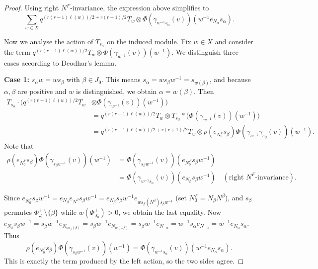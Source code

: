 \documentclass[12pt]{article}
\theoremstyle{remark}
\begin{document}
\begin{proof}
Using right $N^F$-invariance, the expression above simplifies to
$$
\sum_{w \in X} q^{(r(r-1)\ell(w))/2 + r(r+1)/2} T_w \otimes \Phi(\gamma_{w^{-1}s_\alpha}(v))(w^{-1} e_{N_\alpha} s_\alpha).
$$

Now we analyse the action of $T_{s_\alpha}$ on the induced module. Fix $w \in X$ and consider the term $q^{(r(r-1)\ell(w))/2} T_w \otimes \Phi(\gamma_{w^{-1}}(v))(w^{-1})$. We distinguish three cases according to Deodhar's lemma.

\noindent\textbf{Case 1:} $s_\alpha w = w s_\beta$ with $\beta \in J_0$.
This means $s_\alpha = w s_\beta w^{-1} = s_{w(\beta)}$, and because $\alpha,\beta$ are positive and $w$ is distinguished, we obtain $\alpha = w(\beta)$. Then
\begin{align*}
T_{s_\alpha} \cdot \bigl( q^{(r(r-1)\ell(w))/2} T_w &\otimes \Phi(\gamma_{w^{-1}}(v))(w^{-1}) \bigr) \\
&= q^{(r(r-1)\ell(w))/2} T_w \otimes T_{s_\beta} * \bigl( \Phi(\gamma_{w^{-1}}(v))(w^{-1}) \bigr) \\
&= q^{(r(r-1)\ell(w))/2 + r(r+1)/2} T_w \otimes \rho(e_{N_0^F} s_\beta) \Phi(\gamma_{w^{-1}} \gamma_{s_\beta}(v))(w^{-1}).
\end{align*}
Note that
\begin{align*}
\rho(e_{N_0^F} s_\beta) \Phi(\gamma_{s_\beta w^{-1}}(v))(w^{-1})
&= \Phi(\gamma_{s_\beta w^{-1}}(v))(e_{N_0^F} s_\beta w^{-1}) \\
&= \Phi(\gamma_{w^{-1} s_\alpha}(v))(e_{N_\beta} s_\beta w^{-1}) \quad (\text{right $N^F$-invariance}).
\end{align*}

Since $e_{N_0^F}s_\beta w^{-1}=e_{N_\beta}e_{N^{\beta}}s_\beta w^{-1}=e_{N_\beta}s_\beta w^{-1}e_{w s_{\beta}(N^{\beta})s_\beta w^{-1}}$ (set $N_0^F=N_\beta N^{\beta}$), and $s_\beta$ permutes $\Phi_{J_0}^+ \setminus \{\beta\}$ while $w(\Phi_{J_0}^+)>0$, we obtain the last equality.
Now $e_{N_\beta} s_\beta w^{-1} = s_\beta w^{-1} e_{N_{w s_\beta(\beta)}} = s_\beta w^{-1} e_{N_{w(-\beta)}} = s_\beta w^{-1} e_{N_{-\alpha}} = w^{-1} s_\alpha e_{N_{-\alpha}} = w^{-1} e_{N_\alpha} s_\alpha$.
Thus
$$
\rho(e_{N_0^F} s_\beta) \Phi(\gamma_{s_\beta w^{-1}}(v))(w^{-1})
= \Phi(\gamma_{w^{-1} s_\alpha}(v))(w^{-1} e_{N_\alpha} s_\alpha).
$$
This is exactly the term produced by the left action, so the two sides agree.


\end{proof}
\end{document}
